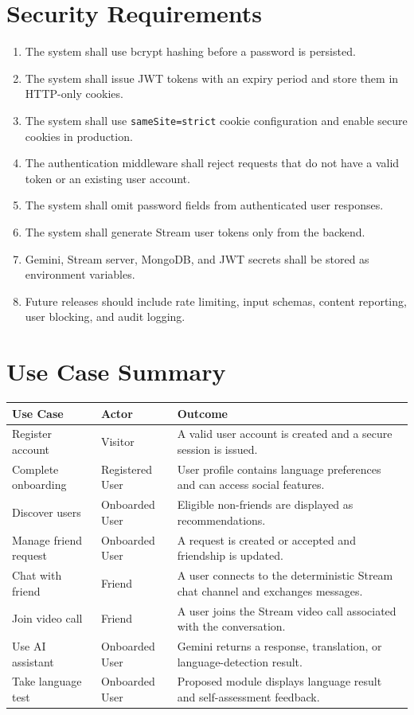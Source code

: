 \documentclass[12pt,a4paper]{report}
\begin{document}
\chapter{Security Requirements}
\begin{enumerate}[label=SR-\arabic*.,leftmargin=0.55in]
\item The system shall use bcrypt hashing before a password is persisted.
\item The system shall issue JWT tokens with an expiry period and store them in HTTP-only cookies.
\item The system shall use \texttt{sameSite=strict} cookie configuration and enable secure cookies in production.
\item The authentication middleware shall reject requests that do not have a valid token or an existing user account.
\item The system shall omit password fields from authenticated user responses.
\item The system shall generate Stream user tokens only from the backend.
\item Gemini, Stream server, MongoDB, and JWT secrets shall be stored as environment variables.
\item Future releases should include rate limiting, input schemas, content reporting, user blocking, and audit logging.
\end{enumerate}

\chapter{Use Case Summary}
\renewcommand{\arraystretch}{1.35}
\begin{longtable}{|p{1.35in}|p{1.25in}|p{3.45in}|}
\hline
\rowcolor{gray!25}\textbf{Use Case} & \textbf{Actor} & \textbf{Outcome} \\ \hline
Register account & Visitor & A valid user account is created and a secure session is issued. \\ \hline
Complete onboarding & Registered User & User profile contains language preferences and can access social features. \\ \hline
Discover users & Onboarded User & Eligible non-friends are displayed as recommendations. \\ \hline
Manage friend request & Onboarded User & A request is created or accepted and friendship is updated. \\ \hline
Chat with friend & Friend & A user connects to the deterministic Stream chat channel and exchanges messages. \\ \hline
Join video call & Friend & A user joins the Stream video call associated with the conversation. \\ \hline
Use AI assistant & Onboarded User & Gemini returns a response, translation, or language-detection result. \\ \hline
Take language test & Onboarded User & Proposed module displays language result and self-assessment feedback. \\ \hline
\end{longtable}
\end{document}
